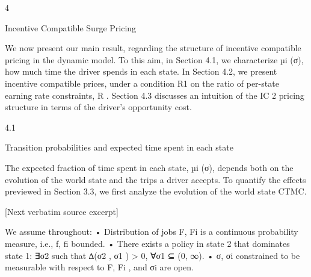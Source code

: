 \documentclass[10pt]{article}
\begin{document}
\begin{ReviewVerbatim}
4

Incentive Compatible Surge Pricing

We now present our main result, regarding the structure of incentive compatible pricing in the
dynamic model. To this aim, in Section 4.1, we characterize µi (σ), how much time the driver
spends in each state. In Section 4.2, we present incentive compatible prices, under a condition
R1
on the ratio of per-state earning rate constraints, R
. Section 4.3 discusses an intuition of the IC
2
pricing structure in terms of the driver’s opportunity cost.

4.1

Transition probabilities and expected time spent in each state

The expected fraction of time spent in each state, µi (σ), depends both on the evolution of the
world state and the trips a driver accepts. To quantify the effects previewed in Section 3.3, we first
analyze the evolution of the world state CTMC.

[Next verbatim source excerpt]

We assume throughout:
• Distribution of jobs F, Fi is a continuous probability measure, i.e., f, fi bounded.
• There exists a policy in state 2 that dominates state 1: ∃σ2 such that ∆(σ2 , σ1 ) > 0, ∀σ1 ⊆
(0, ∞).
• σ, σi constrained to be measurable with respect to F, Fi , and σi are open.
\end{ReviewVerbatim}
\end{document}
